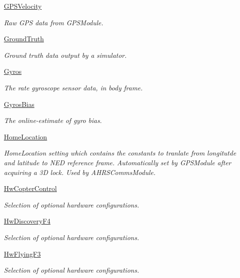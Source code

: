 \begin{DoxyCompactItemize}
\hyperlink{group___g_p_s_velocity}{\-G\-P\-S\-Velocity}
\begin{DoxyCompactList}\small\item\em \-Raw \-G\-P\-S data from \-G\-P\-S\-Module. \end{DoxyCompactList}\item 
\hyperlink{group___ground_truth}{\-Ground\-Truth}
\begin{DoxyCompactList}\small\item\em \-Ground truth data output by a simulator. \end{DoxyCompactList}\item 
\hyperlink{group___gyros}{\-Gyros}
\begin{DoxyCompactList}\small\item\em \-The rate gyroscope sensor data, in body frame. \end{DoxyCompactList}\item 
\hyperlink{group___gyros_bias}{\-Gyros\-Bias}
\begin{DoxyCompactList}\small\item\em \-The online-\/estimate of gyro bias. \end{DoxyCompactList}\item 
\hyperlink{group___home_location}{\-Home\-Location}
\begin{DoxyCompactList}\small\item\em \-Home\-Location setting which contains the constants to tranlate from longitutde and latitude to \-N\-E\-D reference frame. \-Automatically set by \-G\-P\-S\-Module after acquiring a 3\-D lock. \-Used by \-A\-H\-R\-S\-Comms\-Module. \end{DoxyCompactList}\item 
\hyperlink{group___hw_copter_control}{\-Hw\-Copter\-Control}
\begin{DoxyCompactList}\small\item\em \-Selection of optional hardware configurations. \end{DoxyCompactList}\item 
\hyperlink{group___hw_discovery_f4}{\-Hw\-Discovery\-F4}
\begin{DoxyCompactList}\small\item\em \-Selection of optional hardware configurations. \end{DoxyCompactList}\item 
\hyperlink{group___hw_flying_f3}{\-Hw\-Flying\-F3}
\begin{DoxyCompactList}\small\item\em \-Selection of optional hardware configurations. \end{DoxyCompactList}\item 

\end{DoxyCompactItemize}
